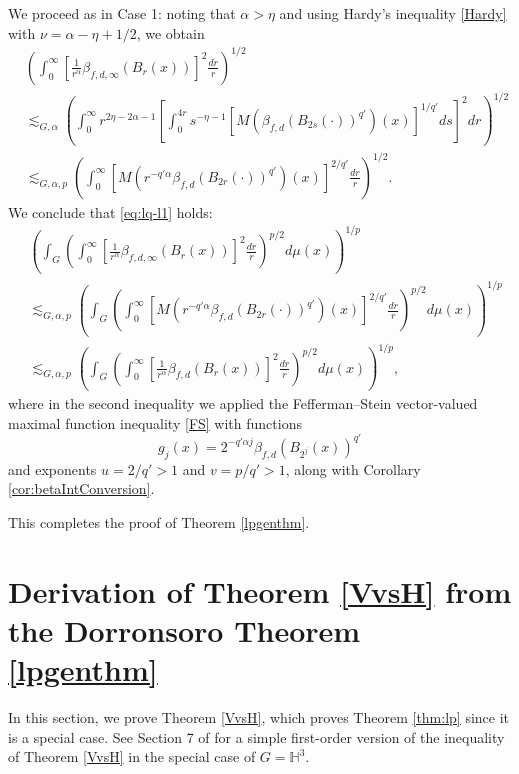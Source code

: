 \documentclass[11pt,reqno]{amsart}
\newcommand{\1}{\mathbf 1}
\begin{document}
\begin{itemize}
We proceed as in Case 1: noting that $\alpha>\eta$ and using Hardy's inequality \eqref{Hardy} with $\nu=\alpha-\eta+1/2$, we obtain
\begin{align*}
&\left( \int_0^{\infty} \left[\frac{1}{r^\alpha}\beta_{f,d,\infty}\left(B_r\left(x\right)\right)\right]^2 \frac{dr}{r} \right)^{1/2} \\
& \lesssim_{G,\alpha} \left(\int_0^{\infty} r^{2\eta - 2\alpha-1} \left[ \int_{0}^{4r} s^{-\eta-1} \left[M\left(\beta_{f,d}\left(B_{2s}\left(\cdot\right)\right)^{q'}\right)\left(x\right)\right]^{1/q'}  ds \right]^2  dr \right)^{1/2} \\
& \lesssim_{G,\alpha,p} \left(\int_0^\infty \left[M\left(r^{-q'\alpha}\beta_{f,d}\left(B_{2r}\left(\cdot\right)\right)^{q'}\right)\left(x\right)\right]^{2/q'} \frac{dr}{r} \right)^{1/2}.
\end{align*}
We conclude that \eqref{eq:lq-l1} holds:
\begin{align*}
&\left( \int_G \left( \int_0^\infty \left[\frac 1{r^\alpha} \beta_{f,d,\infty}\left(B_r\left(x\right)\right)\right]^2  \frac{dr}{r} \right)^{p/2}  d\mu\left(x\right) \right)^{1/p} \\&\lesssim_{G,\alpha,p} \left(\int_G\left(\int_0^\infty \left[M\left(r^{-q'\alpha}\beta_{f,d}\left(B_{2r}\left(\cdot\right)\right)^{q'}\right)\left(x\right)\right]^{2/q'} \frac{dr}{r} \right)^{p/2}d\mu\left(x\right)\right)^{1/p}\\
&\lesssim_{G,\alpha,p} \left(\int_G \left( \int_0^\infty \left[\frac{1}{r^\alpha} \beta_{f,d}\left(B_r\left(x\right)\right) \right]^{2}  \frac{dr}{r} \right)^{p/2}  d\mu\left(x\right) \right)^{1/p},
\end{align*}
where in the second inequality we applied the Fefferman--Stein vector-valued maximal function inequality \eqref{FS} with functions
\[
g_{j}\left(x\right) = 2^{-q'\alpha  j}\beta_{f,d}\left(B_{2^j}\left(x\right)\right)^{q'}
\]
and exponents $u = 2/q' > 1$ and $v = p/q' > 1$, along with Corollary \ref{cor:betaIntConversion}.
\end{itemize}
This completes the proof of Theorem \ref{lpgenthm}.



\section{Derivation of Theorem \ref{VvsH} from the Dorronsoro Theorem \ref{lpgenthm}}\label{sec:VvsH}
In this section, we prove Theorem \ref{VvsH}, which proves Theorem \ref{thm:lp} since it is a special case. See Section 7 of \cite{fassler2020dorronsoro} for a simple first-order version of the inequality of Theorem \ref{VvsH} in the special case of $G=\mathbb{H}^3$.
\end{document}
